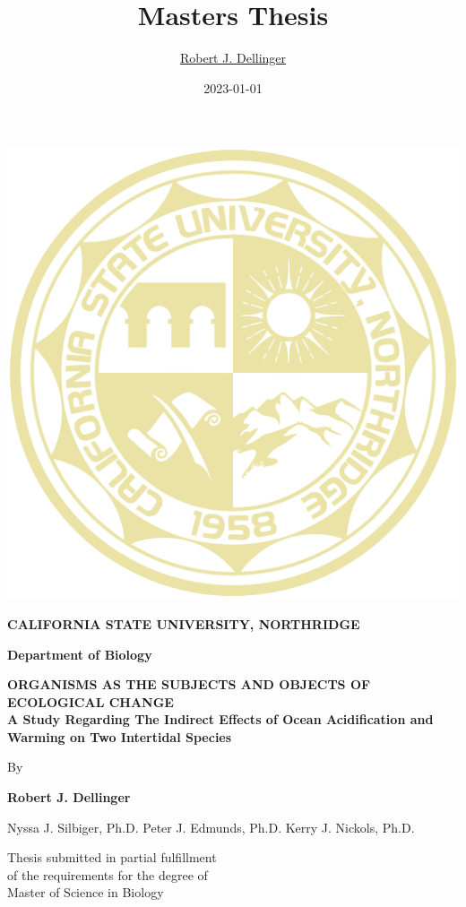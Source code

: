 \documentclass[
  11pt,
]{article}
\title{Masters Thesis}
\author{\href{https://robdellinger.com}{Robert J. Dellinger}}
\date{2023-01-01}
\begin{document}
\maketitle

\newpage

\allsectionsfont{\centering}
\subsectionfont{\raggedright}
\subsubsectionfont{\raggedright}

\begin{centering}

\vspace{3cm}

\vspace{1cm}


\includegraphics[width=0.3\linewidth]{Images/university_logo} 

\vspace{0.5cm}
\Large
{\bf CALIFORNIA STATE UNIVERSITY, NORTHRIDGE}

\Large
{\bf Department of Biology}
\vspace{1cm}
\Large

\doublespacing
{\bf ORGANISMS AS THE SUBJECTS AND OBJECTS OF ECOLOGICAL CHANGE \\
A Study Regarding The Indirect Effects of Ocean Acidification and Warming
on Two Intertidal Species\\}


\normalsize
\singlespacing
By

\vspace{0.5 cm}

\Large
{\bf Robert J. Dellinger}

\vspace{0.5 cm}
{Nyssa J. Silbiger, Ph.D.}
{Peter J. Edmunds, Ph.D.}
{Kerry J. Nickols, Ph.D.}


\vspace{1.5 cm}
Thesis submitted in partial fulfillment \\
of the requirements for the degree of  \\
Master of Science in Biology \\
\vspace{1.5 cm}


\end{centering}
\end{document}
